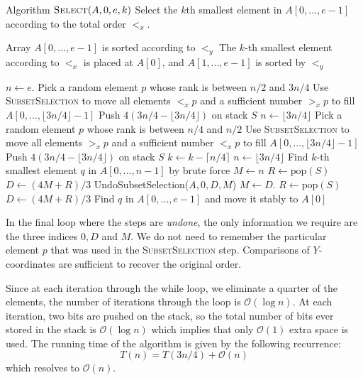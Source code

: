 \documentclass{elsart}
\newcommand{\Oh}[1]{\ensuremath{\mathcal{O}(#1)}}
\begin{document}
\begin{algorithm}
  \caption{Algorithm
    $\textsc{Select}(A,0,e,k)$ Select the $k$th smallest element in
    $A[0,\ldots,e-1]$ according to the total order $<_x$.}

  \label{alg:selectk}\label{alg:find}
  \begin{algorithmic}[1]
    \REQUIRE Array $A[0,\ldots, e-1]$ is sorted according to $<_y$
    \ENSURE The $k$-th smallest element according to $<_x$ is placed at
$A[0]$, and $A[1,\ldots, e-1]$ is sorted by $<_y$

    \STATE $n \gets e$. 
             \STATE Pick a random element $p$ whose rank is between $n/2$ and $3n/4$
             \STATE Use \textsc{SubsetSelection} to move all elements
$<_x p$ and a sufficient number $>_x p$ to fill $A[0,\ldots,\lfloor 3n/4 \rfloor - 1]$
             \STATE Push $4(3n/4 - \lfloor 3n/4 \rfloor)$ on stack $S$
             \STATE $n \gets \lfloor 3n/4 \rfloor$
          \ELSE
             \STATE Pick a random element $p$ whose rank is between $n/4$ and $n/2$
             \STATE Use \textsc{SubsetSelection} to move all elements
$>_x p$ and a sufficient number $<_x p$ to fill $A[0,\ldots,\lfloor 3n/4 \rfloor - 1]$
             \STATE Push $4(3n/4 - \lfloor 3n/4 \rfloor)$ on stack $S$
             \STATE $k \gets k - \lceil n/4 \rceil$
             \STATE $n \gets \lfloor 3n/4 \rfloor$
          \ENDIF
    \ENDWHILE
    \STATE Find $k$-th smallest element $q$ in $A[0,\ldots,n-1]$ by brute force
    \STATE $M \gets n$
    \STATE $R \gets \mathrm{pop}(S)$
    \STATE $D \gets (4M + R)/3$
          \STATE UndoSubsetSelection($A,0,D,M$)
          \STATE $M \gets D$.
          \STATE $R \gets \mathrm{pop}(S)$
          \STATE $D \gets (4M + R)/3$
    \ENDWHILE
    \STATE Find $q$ in $A[0,\ldots, e-1]$ and move it stably to $A[0]$
  \end{algorithmic}
\end{algorithm}

In the final loop where the steps are {\em undone}, the only
information we require are the three indices $0, D$ and $M$. We do not
need to remember the particular element $p$ that was used in the
\textsc{SubsetSelection} step.  Comparisons of $Y$-coordinates
are sufficient to recover the original order. 

Since at each iteration through the while loop, we eliminate a quarter
of the elements, the number of iterations through the loop is \Oh{\log
n}. At each iteration, two bits are pushed on the stack, so the total
number of bits ever stored in the stack is \Oh{\log n} which implies
that only \Oh{1} extra space is used. The running time of the
algorithm is given by the following recurrence: \[ T(n) = T(3n/4) +
\Oh{n} \] which resolves to \Oh{n}.
\end{document}
